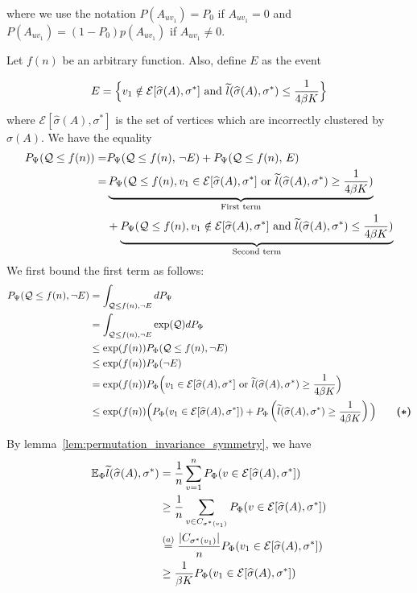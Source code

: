 \documentclass{article}
\begin{document}
where we use the notation $P(A_{uv_1}) = P_0$ if $A_{uv_1} = 0$ and $P(A_{uv_1}) = (1-P_0)p(A_{uv_1})$ if $A_{uv_1} \neq 0$. 

Let $f(n)$ be an arbitrary function. Also, define $E$ as the event
 
$$E = \Big\{ v_1 \notin\mathcal{E}[\widehat{\sigma}(A), \sigma^*] \textrm{ and } \widetilde{l}(\widehat{\sigma}(A), \sigma^*) \leq \frac{1}{4\beta K} \Big\}$$ 
where $\mathcal{E}[\hat{\sigma}(A), \sigma^*]$ is the set of vertices which are incorrectly clustered by $\hat \sigma(A)$. We have the equality
\begin{align}
P_{\Psi}( \mathcal{Q} \leq f(n) ) =& P_{\Psi}( \mathcal{Q} \leq f(n),\, \neg E) + P_{\Psi}( \mathcal{Q} \leq f(n),\, E)  \nonumber\\
  =&
  \underbrace{P_{\Psi}( \mathcal{Q} \leq f(n), v_1 \in \mathcal{E}[\widehat{\sigma}(A), \sigma^*] 
       \textrm{ or } \widetilde{l}(\widehat{\sigma}(A), \sigma^*) \geq \frac{1}{4\beta K}    )}_{\textrm{First term}} \nonumber \\
& +  
 \underbrace{P_{\Psi}( \mathcal{Q} \leq f(n), v_1 \notin \mathcal{E}[\widehat{\sigma}(A), \sigma^*] 
        \textrm{ and } \widetilde{l}(\widehat{\sigma}(A), \sigma^*) \leq \frac{1}{4\beta K} )}_{\textrm{Second term}} \label{eqn:psi_Q_bound}
\end{align}
We first bound the first term as follows:
\begin{align*}
P_{\Psi}( \mathcal{Q} \leq f(n), \neg E) &= \int_{\mathcal{Q} \leq f(n), \neg E} d P_{\Psi} \\
    &= \int_{\mathcal{Q} \leq f(n), \neg E} \exp(\mathcal{Q}) d P_{\Phi} \\
    &\leq \exp(f(n)) P_{\Phi}( \mathcal{Q} \leq f(n), \neg E) \\
    &\leq \exp(f(n)) P_{\Phi}(\neg E) \\
    &= \exp(f(n)) P_{\Phi}\Big(v_1 \in \mathcal{E}[\widehat{\sigma}(A), \sigma^*] 
       \textrm{ or } \widetilde{l}(\widehat{\sigma}(A), \sigma^*) \geq \frac{1}{4\beta K} \Big)  \\
    &\leq \exp(f(n)) \Big( P_{\Phi}(v_1 \in \mathcal{E}[\widehat{\sigma}(A), \sigma^*]) + 
               P_{\Phi} \left( \widetilde{l}(\widehat{\sigma}(A), \sigma^*) \geq \frac{1}{4\beta K}  \right) \Big)    \qquad \mbox{\boldmath $(*)$}
\end{align*}

By lemma~\ref{lem:permutation_invariance_symmetry}, we have
\begin{align*}
 {\mathbb E}_{\Phi}  \widetilde{l}(\widehat{\sigma}(A), \sigma^*) &= 
    \frac{1}{n} \sum_{v=1}^n P_{\Phi}( v \in \mathcal{E}[\widehat{\sigma}(A), \sigma^*]) \\
  &\geq \frac{1}{n} \sum_{v \in C_{\sigma^*(v_1)}} P_{\Phi}( v \in \mathcal{E}[\widehat{\sigma}(A), \sigma^*]) \\
  &\stackrel{(a)}= \frac{|C_{\sigma^*(v_1)}|}{n} P_{\Phi}( v_1 \in \mathcal{E}[\widehat{\sigma}(A), \sigma^*]) \\
  &\geq \frac{1}{ \beta K} P_{\Phi}( v_1 \in \mathcal{E}[\widehat{\sigma}(A), \sigma^*])
\end{align*}
\end{document}
